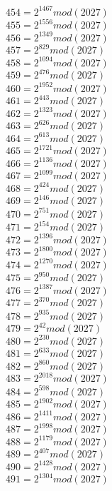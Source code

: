 \documentclass[12pt, letterpaper]{article}
\begin{document}
\begin{itemize}
\begin{multicols}{3}
$454= 2^{1467} mod (2027)$\\
$455= 2^{1556} mod (2027)$\\
$456= 2^{1349} mod (2027)$\\
$457= 2^{829} mod (2027)$\\
$458= 2^{1094} mod (2027)$\\
$459= 2^{476} mod (2027)$\\
$460= 2^{1952} mod (2027)$\\
$461= 2^{443} mod (2027)$\\
$462= 2^{1323} mod (2027)$\\
$463= 2^{626} mod (2027)$\\
$464= 2^{613} mod (2027)$\\
$465= 2^{1721} mod (2027)$\\
$466= 2^{1136} mod (2027)$\\
$467= 2^{1099} mod (2027)$\\
$468= 2^{424} mod (2027)$\\
$469= 2^{146} mod (2027)$\\
$470= 2^{751} mod (2027)$\\
$471= 2^{154} mod (2027)$\\
$472= 2^{1396} mod (2027)$\\
$473= 2^{1800} mod (2027)$\\
$474= 2^{1270} mod (2027)$\\
$475= 2^{950} mod (2027)$\\
$476= 2^{1387} mod (2027)$\\
$477= 2^{370} mod (2027)$\\
$478= 2^{935} mod (2027)$\\
$479= 2^{42} mod (2027)$\\
$480= 2^{230} mod (2027)$\\
$481= 2^{633} mod (2027)$\\
$482= 2^{860} mod (2027)$\\
$483= 2^{2018} mod (2027)$\\
$484= 2^{598} mod (2027)$\\
$485= 2^{1902} mod (2027)$\\
$486= 2^{1411} mod (2027)$\\
$487= 2^{1998} mod (2027)$\\
$488= 2^{1179} mod (2027)$\\
$489= 2^{407} mod (2027)$\\
$490= 2^{1428} mod (2027)$\\
$491= 2^{1304} mod (2027)$\\

\end{multicols}
\end{itemize}
\end{document}
